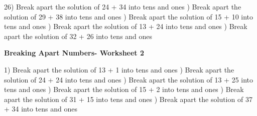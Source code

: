 \documentclass{article}%
\begin{document}
26) Break apart the solution of 24 + 34 into tens and ones%
\newline%
\newline%
) Break apart the solution of 29 + 38 into tens and ones%
\newline%
\newline%
) Break apart the solution of 15 + 10 into tens and ones%
\newline%
\newline%
) Break apart the solution of 13 + 24 into tens and ones%
\newline%
\newline%
) Break apart the solution of 32 + 26 into tens and ones%
\newline%
\newline%
\newline%
\pagebreak%
\large%
\begin{center}%
\textbf{Breaking Apart Numbers- Worksheet 2}%
\newline%
\newline%
\newline%
\end{center} \normalsize%
1) Break apart the solution of 13 + 1 into tens and ones%
\newline%
\newline%
) Break apart the solution of 24 + 24 into tens and ones%
\newline%
\newline%
) Break apart the solution of 13 + 25 into tens and ones%
\newline%
\newline%
) Break apart the solution of 15 + 2 into tens and ones%
\newline%
\newline%
) Break apart the solution of 31 + 15 into tens and ones%
\newline%
\newline%
) Break apart the solution of 37 + 34 into tens and ones%
\newline%
\newline%
\newline%
\end{document}
